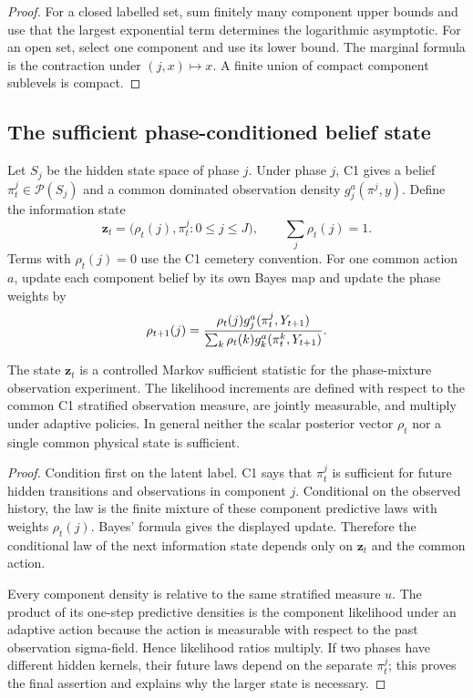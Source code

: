 \begin{proof}
For a closed labelled set, sum finitely many component upper bounds and use
that the largest exponential term determines the logarithmic asymptotic.  For
an open set, select one component and use its lower bound.  The marginal
formula is the contraction under $(j,x)\mapsto x$.  A finite union of compact
component sublevels is compact.
\end{proof}

\subsection{The sufficient phase-conditioned belief state}

Let $S_j$ be the hidden state space of phase $j$.  Under phase $j$, C1 gives a
belief $\pi_t^j\in\mathcal P(S_j)$ and a common dominated observation density
$g_j^a(\pi^j,y)$.  Define the information state
\[
 \mathbf z_t=\bigl(\rho_t(j),\pi_t^j:0\le j\le J\bigr),
 \qquad \sum_j\rho_t(j)=1.
\]
Terms with $\rho_t(j)=0$ use the C1 cemetery convention.  For one common
action $a$, update each component belief by its own Bayes map and update the
phase weights by
\[
 \rho_{t+1}(j)=
 {\rho_t(j)g_j^a(\pi_t^j,Y_{t+1})
  \over
  \sum_k\rho_t(k)g_k^a(\pi_t^k,Y_{t+1})}.
\]

\begin{theorem}
\label{thm:r21-d1-information}
The state $\mathbf z_t$ is a controlled Markov sufficient statistic for the
phase-mixture observation experiment.  The likelihood increments are defined
with respect to the common C1 stratified observation measure, are jointly
measurable, and multiply under adaptive policies.  In general neither the
scalar posterior vector $\rho_t$ nor a single common physical state is
sufficient.
\end{theorem}

\begin{proof}
Condition first on the latent label.  C1 says that $\pi_t^j$ is sufficient for
future hidden transitions and observations in component $j$.  Conditional on
the observed history, the law is the finite mixture of these component
predictive laws with weights $\rho_t(j)$.  Bayes' formula gives the displayed
update.  Therefore the conditional law of the next information state depends
only on $\mathbf z_t$ and the common action.

Every component density is relative to the same stratified measure $
u$.
The product of its one-step predictive densities is the component likelihood
under an adaptive action because the action is measurable with respect to the
past observation sigma-field.  Hence likelihood ratios multiply.  If two
phases have different hidden kernels, their future laws depend on the separate
$\pi_t^j$; this proves the final assertion and explains why the larger state is
necessary.
\end{proof}

